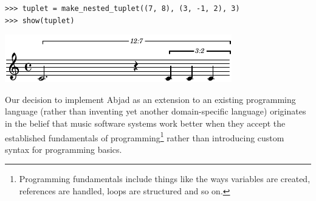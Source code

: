 \documentclass{article}
\begin{document}
\begin{lstlisting}
>>> tuplet = make_nested_tuplet((7, 8), (3, -1, 2), 3)
>>> show(tuplet)
\end{lstlisting}
\includegraphics{assets/lilypond-4926e77647583925d3a89653f8577025.pdf}

Our decision to implement Abjad as an extension to an
existing programming language (rather than inventing yet another domain-specific
language) originates in the belief that music software systems work better when they accept the established fundamentals of programming\footnote{Programming fundamentals include things like the ways variables are created, references are handled, loops are structured and so on.} rather than introducing custom syntax for programming basics. 
\end{document}
